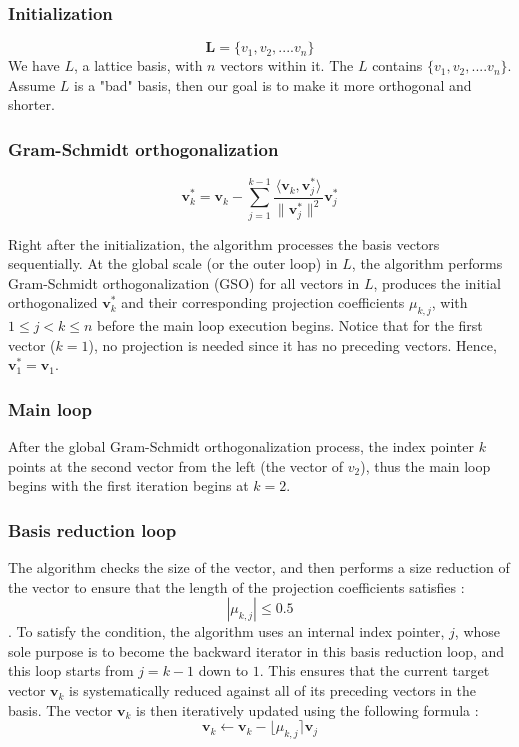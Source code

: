 \documentclass[runningheads]{llncs}
\begin{document}
\subsubsection{Initialization}
\mbox{}
$$\mathbf{L} = \{v_1, v_2, ....v_n\}$$
We have $L$, a lattice basis, with $n$ vectors within it. The $L$ contains ${\{v_1, v_2, ....v_n\}}$. Assume $L$ is a "bad" basis, then our goal is to make it more orthogonal and shorter. 

\subsubsection{Gram-Schmidt orthogonalization}
\mbox{}
$$\mathbf{v}_k^* = \mathbf{v}_k - \sum_{j=1}^{k-1} \frac{\langle \mathbf{v}_k, \mathbf{v}_j^* \rangle}{\|\mathbf{v}_j^*\|^2} \mathbf{v}_j^*$$

Right after the initialization, the algorithm processes the basis vectors sequentially. At the global scale (or the outer loop) in $L$, the algorithm performs Gram-Schmidt orthogonalization (GSO) for all vectors in $L$, produces the initial orthogonalized $\mathbf{v}_k^*$ and their corresponding projection coefficients $\mu_{k,j}$, with $1 \le j < k \le n$ before the main loop execution begins. Notice that for the first vector ($k = 1$), no projection is needed since it has no preceding vectors. Hence, $\mathbf{v}_1^* = \mathbf{v}_1$.

\subsubsection{Main loop}
\mbox{}
After the global Gram-Schmidt orthogonalization process, the index pointer $k$ points at the second vector from the left (the vector of $v_2$), thus the main loop begins with the first iteration begins at $k=2$.

\subsubsection{Basis reduction loop}
\mbox{}
The algorithm checks the size of the vector, and then performs a size reduction of the vector to ensure that the length of the projection coefficients satisfies : $$|\mu_{k,j}| \leq 0.5$$. To satisfy the condition, the algorithm uses an internal index pointer, $j$, whose sole purpose is to become the backward iterator in this basis reduction loop, and this loop starts from $j = k - 1$ down to $1$. This ensures that the current target vector $\mathbf{v}_k$ is systematically reduced against all of its preceding vectors in the basis. The vector $\mathbf{v}_k$ is then iteratively updated using the following formula :
$$\mathbf{v}_k \leftarrow \mathbf{v}_k - \lfloor\mu_{k,j}\rceil\mathbf{v}_j$$
\end{document}
